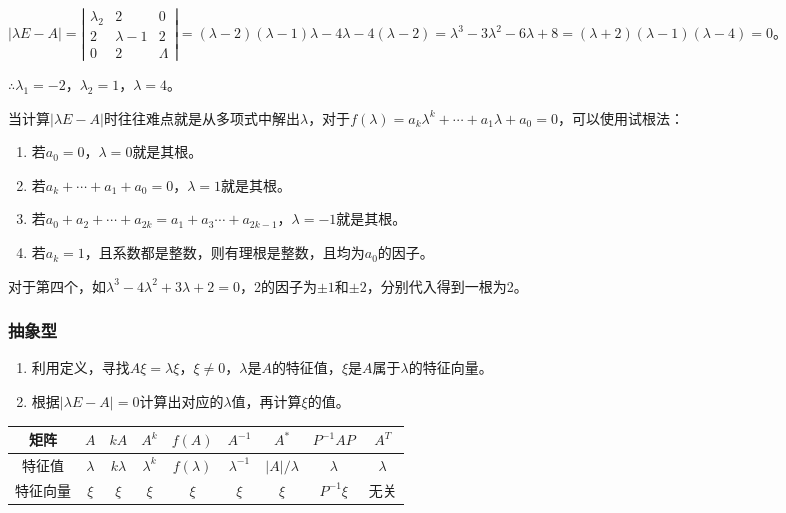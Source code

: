 \documentclass[UTF8, 12pt]{ctexart}
\begin{document}
$\vert\lambda E-A\vert=\left|\begin{array}{ccc}
\lambda_2 & 2 & 0 \\
2 & \lambda-1 & 2 \\
0 & 2 & \Lambda
\end{array}\right|=(\lambda-2)(\lambda-1)\lambda-4\lambda-4(\lambda-2)=\lambda^3-3\lambda^2-6\lambda+8=(\lambda+2)(\lambda-1)(\lambda-4)=0$。

$\therefore\lambda_1=-2$，$\lambda_2=1$，$\lambda=4$。

当计算$\vert\lambda E-A\vert$时往往难点就是从多项式中解出$\lambda$，对于$f(\lambda)=a_k\lambda^k+\cdots+a_1\lambda+a_0=0$，可以使用试根法：

\begin{enumerate}
\item 若$a_0=0$，$\lambda=0$就是其根。
\item 若$a_k+\cdots+a_1+a_0=0$，$\lambda=1$就是其根。
\item 若$a_0+a_2+\cdots+a_{2k}=a_1+a_3\cdots+a_{2k-1}$，$\lambda=-1$就是其根。
\item 若$a_k=1$，且系数都是整数，则有理根是整数，且均为$a_0$的因子。
\end{enumerate}

对于第四个，如$\lambda^3-4\lambda^2+3\lambda+2=0$，2的因子为$\pm1$和$\pm2$，分别代入得到一根为2。

\subsubsection{抽象型}

\begin{enumerate}
\item 利用定义，寻找$A\xi=\lambda\xi$，$\xi\neq0$，$\lambda$是$A$的特征值，$\xi$是$A$属于$\lambda$的特征向量。
\item 根据$\vert\lambda E-A\vert=0$计算出对应的$\lambda$值，再计算$\xi$的值。
\end{enumerate}

\begin{tabular}{|c|c|c|c|c|c|c|c|c|}
\hline
矩阵 & $A$ & $kA$ & $A^k$ & $f(A)$ & $A^{-1}$ & $A^*$ & $P^{-1}AP$ & $A^T$ \\ \hline
特征值 & $\lambda$ & $k\lambda$ & $\lambda^k$ & $f(\lambda)$ & $\lambda^{-1}$ & $\vert A\vert/\lambda$ & $\lambda$ & $\lambda$ \\ \hline
特征向量 & $\xi$ & $\xi$ & $\xi$ & $\xi$ & $\xi$ & $\xi$ & $P^{-1}\xi$ & 无关 \\
\hline
\end{tabular} \medskip
\end{document}
